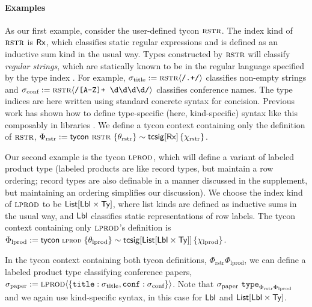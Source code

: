 \documentclass[10pt,preprint]{sigplanconf}
\begin{document}
\paragraph{Examples}
As our first example, consider the user-defined tycon $\textsc{rstr}$. The index kind of $\textsc{rstr}$ is ${\sf Rx}$, which classifies static regular expressions and is defined as an inductive sum kind in the usual way. Types constructed by $\textsc{rstr}$ will classify \emph{regular strings}, which are statically known to be in the regular language specified by the type index  \cite{sanitation-psp14}. For example, $\sigma_\text{title} := {\textsc{rstr}}\langle\texttt{/.+/}\rangle$ classifies non-empty strings and $\sigma_\text{conf} := {\textsc{rstr}}\langle\texttt{/[A-Z]+ \textbackslash d\textbackslash d\textbackslash d\textbackslash d/}\rangle$ classifies conference names.  The type indices are  here written using standard concrete syntax for concision. Previous work has shown how to define type-specific (here, kind-specific) syntax like this composably in libraries \cite{TSLs}. We define a tycon context containing only the definition of $\textsc{rstr}$, $\Phi_\text{rstr} := {\sf tycon}~\textsc{rstr} ~\{\theta_\text{rstr}\} \sim {\sf tcsig}[{\sf Rx}]\,\{\chi_\text{rstr}\}$.

Our second example is the tycon $\textsc{lprod}$, which will define a variant of labeled product type (labeled products are like record types, but maintain a row  ordering; record types are also definable in a manner discussed in the supplement, but maintaining an ordering simplifies our discussion). We choose the index kind of $\textsc{lprod}$ to be ${\sf List}[{\sf Lbl} \times {\sf Ty}]$, where list kinds are defined as inductive sums in the usual way, and ${\sf Lbl}$ classifies static representations of row labels. The tycon context containing only $\textsc{lprod}$'s definition is $\small\Phi_\text{lprod} := \tcdef{\tcvar{lprod}}{\tcsig{\klist{\klbl \times \kty}}{\chi_\text{lprod}}}{\theta_\text{lprod}}$.

In the tycon context containing both tycon definitions, $\Phi_\text{rstr}\Phi_\text{lprod}$, we can define a labeled product type classifying conference papers, $\sigma_\text{paper} := {\textsc{lprod}}\langle\{\texttt{title} : \sigma_\text{title}, \texttt{conf} : \sigma_\text{conf}\}\rangle$. Note that $\sigma_\text{paper}~\texttt{type}_{\Phi_\text{rstr}\Phi_\text{lprod}}$ and we again use kind-specific syntax, in this case for ${\sf Lbl}$ and ${\sf List}[{\sf Lbl} \times {\sf Ty}]$.
\end{document}
